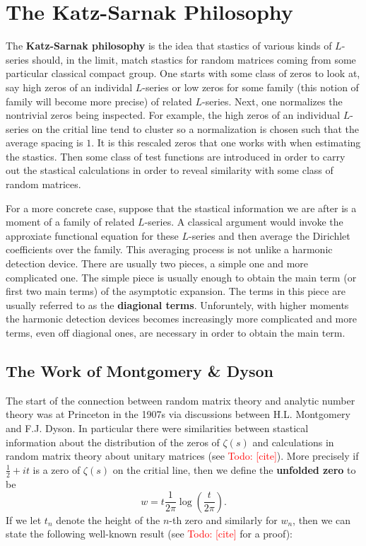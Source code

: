 \documentclass[12pt]{book}
\theoremstyle{definition}\newframedtheorem{method}{Method}
\newcommand{\z}{\zeta}
\newcommand{\<}{\langle}
\renewcommand{\>}{\rangle}
\newcommand{\todo}[1]{\textcolor{red}{\sf Todo: [#1]}}
\begin{document}
  \section{The Katz-Sarnak Philosophy}
    The \textbf{Katz-Sarnak philosophy} is the idea that stastics of various kinds of $L$-series should, in the limit, match stastics for random matrices coming from some particular classical compact group. One starts with some class of zeros to look at, say high zeros of an individal $L$-series or low zeros for some family (this notion of family will become more precise) of related $L$-series. Next, one normalizes the nontrivial zeros being inspected. For example, the high zeros of an individual $L$-series on the critial line tend to cluster so a normalization is chosen such that the average spacing is $1$. It is this rescaled zeros that one works with when estimating the stastics. Then some class of test functions are introduced in order to carry out the stastical calculations in order to reveal similarity with some class of random matrices.

    For a more concrete case, suppose that the stastical information we are after is a moment of a family of related $L$-series. A classical argument would invoke the approxiate functional equation for these $L$-series and then average the Dirichlet coefficients over the family. This averaging process is not unlike a harmonic detection device. There are usually two pieces, a simple one and more complicated one. The simple piece is usually enough to obtain the main term (or first two main terms) of the asymptotic expansion. The terms in this piece are usually referred to as the \textbf{diagional terms}. Unforuntely, with higher moments the harmonic detection devices becomes increasingly more complicated and more terms, even off diagional ones, are necessary in order to obtain the main term.
    \subsection*{The Work of Montgomery \& Dyson}
      The start of the connection between random matrix theory and analytic number theory was at Princeton in the 1907s via discussions between H.L. Montgomery and F.J. Dyson. In particular there were similarities between stastical information about the distribution of the zeros of $\z(s)$ and calculations in random matrix theory about unitary matrices (see \todo{cite}). More precisely if $\frac{1}{2}+it$ is a zero of $\z(s)$ on the critial line, then we define the \textbf{unfolded zero} to be
      \[
        w = t\frac{1}{2\pi}\log\left(\frac{t}{2\pi}\right).
      \]
      If we let $t_{n}$ denote the height of the $n$-th zero and similarly for $w_{n}$, then we can state the following well-known result (see \todo{cite} for a proof):
\end{document}
